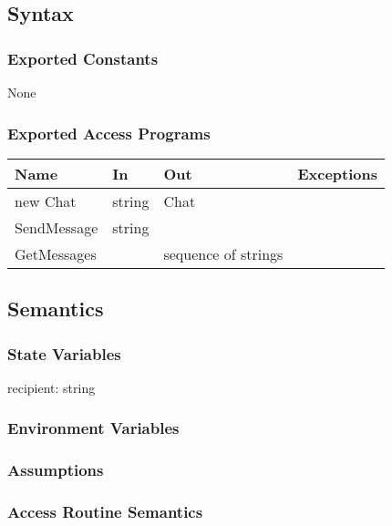 \documentclass[12pt, titlepage]{article}
\begin{document}
\subsection{Syntax}

\subsubsection{Exported Constants}

None

\subsubsection{Exported Access Programs}

\begin{center}
\begin{tabular}{p{2cm} p{4cm} p{4cm} p{2cm}}
\hline
\textbf{Name} & \textbf{In} & \textbf{Out} & \textbf{Exceptions} \\
\hline
new Chat & string & Chat & \\
SendMessage & string & & \\
GetMessages & & sequence of strings & \\
\hline
\end{tabular}
\end{center}

\subsection{Semantics}

\subsubsection{State Variables}

recipient: string

\subsubsection{Environment Variables}

\subsubsection{Assumptions}

\subsubsection{Access Routine Semantics}
\end{document}
